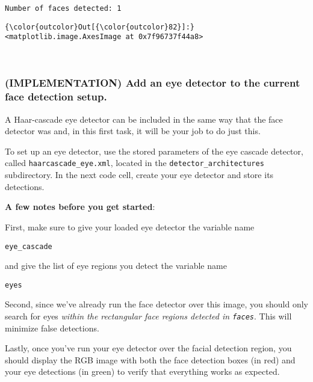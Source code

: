 \documentclass[11pt]{article}
\begin{document}
    \begin{Verbatim}[commandchars=\\\{\}]
Number of faces detected: 1

    \end{Verbatim}

\begin{Verbatim}[commandchars=\\\{\}]
{\color{outcolor}Out[{\color{outcolor}82}]:} <matplotlib.image.AxesImage at 0x7f96737f44a8>
\end{Verbatim}
            
    \begin{center}
    \end{center}
    { \hspace*{\fill} \\}
    
    \hypertarget{implementation-add-an-eye-detector-to-the-current-face-detection-setup.}{%
\subsubsection{(IMPLEMENTATION) Add an eye detector to the current face
detection
setup.}\label{implementation-add-an-eye-detector-to-the-current-face-detection-setup.}}

A Haar-cascade eye detector can be included in the same way that the
face detector was and, in this first task, it will be your job to do
just this.

    To set up an eye detector, use the stored parameters of the eye cascade
detector, called \texttt{haarcascade\_eye.xml}, located in the
\texttt{detector\_architectures} subdirectory. In the next code cell,
create your eye detector and store its detections.

\textbf{A few notes before you get started}:

First, make sure to give your loaded eye detector the variable name

\texttt{eye\_cascade}

and give the list of eye regions you detect the variable name

\texttt{eyes}

Second, since we've already run the face detector over this image, you
should only search for eyes \emph{within the rectangular face regions
detected in \texttt{faces}}. This will minimize false detections.

Lastly, once you've run your eye detector over the facial detection
region, you should display the RGB image with both the face detection
boxes (in red) and your eye detections (in green) to verify that
everything works as expected.
\end{document}

